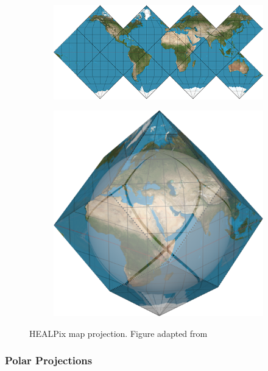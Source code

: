 \begin{figure}[htbp]
    \centering
    \begin{subfigure}[bt]{0.5\textwidth}
        \includegraphics[width=\textwidth]{figures/developable_projected/healpix.png}
    \end{subfigure}
    \qquad
    \begin{subfigure}[bt]{0.2\textwidth}
        \includegraphics[width=\textwidth]{figures/map_projection/projection_healpix.png}
    \end{subfigure}
    \caption{HEALPix map projection. Figure adapted from \cite{mapprojections}}
    \label{fig:proj_healpix}
\end{figure}

\subsubsection{Polar Projections}

